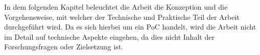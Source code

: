 
In dem folgenden Kapitel beleuchtet die Arbeit die Konzeption und die Vorgehensweise, mit welcher der Technische und Praktische Teil der Arbeit durchgeführt wird.
Da es sich hierbei um ein PoC handelt, wird die Arbeit nicht im Detail auf technische Aspekte eingehen, da dies nicht Inhalt der Forschungsfragen oder Zielsetzung ist.